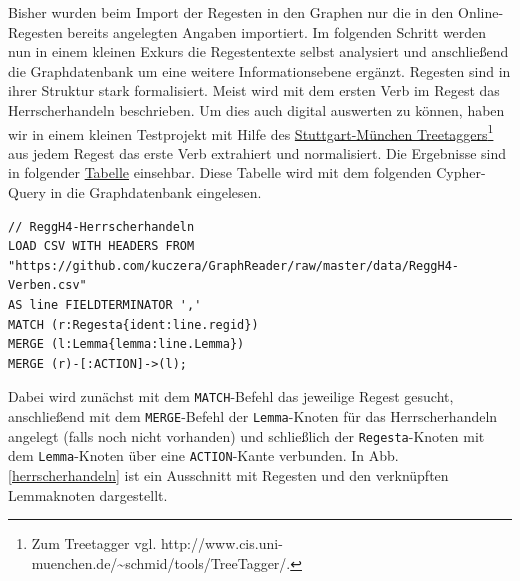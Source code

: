 \documentclass[ngerman,]{scrreprt}
\begin{document}
Bisher wurden beim Import der Regesten in den Graphen nur die in den Online-Regesten bereits angelegten Angaben importiert. Im folgenden Schritt werden nun in einem kleinen Exkurs die Regestentexte selbst analysiert und anschließend die Graphdatenbank um eine weitere Informationsebene ergänzt. Regesten sind in ihrer Struktur stark formalisiert. Meist wird mit dem ersten Verb im Regest das Herrscherhandeln beschrieben. Um dies auch digital auswerten zu können, haben wir in einem kleinen Testprojekt mit Hilfe des \href{http://www.cis.uni-muenchen.de/~schmid/tools/TreeTagger/}{Stuttgart-München Treetaggers}\footnote{Zum Treetagger vgl. http://www.cis.uni-muenchen.de/\textasciitilde{}schmid/tools/TreeTagger/.} aus jedem Regest das erste Verb extrahiert und normalisiert. Die Ergebnisse sind in folgender \href{https://docs.google.com/spreadsheets/d/1nlbZmQYcT1E3Z58yPmcnulcNQc1e3111Di-4huhV-FY/edit?usp=sharing}{Tabelle} einsehbar. Diese Tabelle wird mit dem folgenden Cypher-Query in die Graphdatenbank eingelesen.

\begin{verbatim}
// ReggH4-Herrscherhandeln
LOAD CSV WITH HEADERS FROM "https://github.com/kuczera/GraphReader/raw/master/data/ReggH4-Verben.csv"
AS line FIELDTERMINATOR ','
MATCH (r:Regesta{ident:line.regid})
MERGE (l:Lemma{lemma:line.Lemma})
MERGE (r)-[:ACTION]->(l);
\end{verbatim}

Dabei wird zunächst mit dem \texttt{MATCH}-Befehl das jeweilige Regest gesucht, anschließend mit dem \texttt{MERGE}-Befehl der \texttt{Lemma}-Knoten für das Herrscherhandeln angelegt (falls noch nicht vorhanden) und schließlich der \texttt{Regesta}-Knoten mit dem \texttt{Lemma}-Knoten über eine \texttt{ACTION}-Kante verbunden. In Abb. \ref{herrscherhandeln} ist ein Ausschnitt mit Regesten und den verknüpften Lemmaknoten dargestellt.
\end{document}
